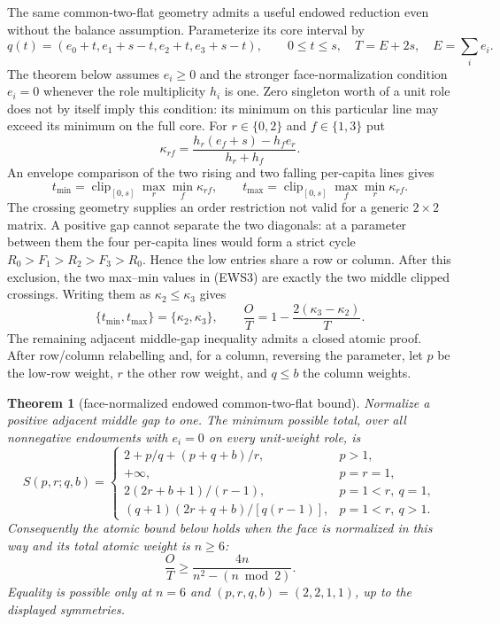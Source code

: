 \documentclass[11pt]{article}
\newtheorem{theorem}{Theorem}
\begin{document}
The same common-two-flat geometry admits a useful endowed reduction even
without the balance assumption.  Parameterize its core interval by
\[
 q(t)=(e_0+t,e_1+s-t,e_2+t,e_3+s-t),\qquad 0\le t\le s,
 \quad T=E+2s,\quad E=\sum_i e_i.                         \tag{EWS1}
\]
The theorem below assumes $e_i\ge0$ and the stronger face-normalization
condition $e_i=0$ whenever the role multiplicity $h_i$ is one.  Zero
singleton worth of a unit role does not by itself imply this condition: its
minimum on this particular line may exceed its minimum on the full core.
For $r\in\{0,2\}$ and
$f\in\{1,3\}$ put
\[
 \kappa_{rf}=\frac{h_r(e_f+s)-h_f e_r}{h_r+h_f}.          \tag{EWS2}
\]
An envelope comparison of the two rising and two falling per-capita lines
gives
\[
 t_{\min}=\operatorname{clip}_{[0,s]}\max_r\min_f\kappa_{rf},
 \qquad
 t_{\max}=\operatorname{clip}_{[0,s]}\max_f\min_r\kappa_{rf}. \tag{EWS3}
\]
The crossing geometry supplies an order restriction not valid for a generic
$2\times2$ matrix.  A positive gap cannot separate the two diagonals: at a
parameter between them the four
per-capita lines would form a strict cycle
$R_0>F_1>R_2>F_3>R_0$.  Hence the low entries share a row or column.  After
this exclusion, the two max--min values in (EWS3) are exactly the two middle
clipped crossings.  Writing them as
$\kappa_2\le\kappa_3$ gives
\[
 \{t_{\min},t_{\max}\}=\{\kappa_2,\kappa_3\},\qquad
 \frac OT=1-\frac{2(\kappa_3-\kappa_2)}{T}.                \tag{EWS4}
\]
The remaining adjacent middle-gap inequality admits a closed atomic proof.
After
row/column relabelling and, for a column, reversing the parameter, let $p$ be
the low-row weight, $r$ the other row weight, and $q\le b$ the column
weights.

\begin{theorem}[face-normalized endowed common-two-flat bound]\label{thm:endowed-seesaw}
Normalize a positive adjacent middle gap to one.  The minimum possible total,
over all nonnegative endowments with $e_i=0$ on every unit-weight role, is
\[
 S(p,r;q,b)=
 \begin{cases}
  2+p/q+(p+q+b)/r,&p>1,\\
  +\infty,&p=r=1,\\
  2(2r+b+1)/(r-1),&p=1<r,\ q=1,\\
  (q+1)(2r+q+b)/[q(r-1)],&p=1<r,\ q>1.
 \end{cases}                                             \tag{EWS5}
\]
Consequently the atomic bound below holds when the face is normalized in this
way and its total atomic weight is $n\ge6$:
\[
 \frac OT\ge \frac{4n}{n^2-(n\bmod2)}.                   \tag{EWS6}
\]
Equality is possible only at $n=6$ and
$(p,r,q,b)=(2,2,1,1)$, up to the displayed symmetries.
\end{theorem}
\end{document}
